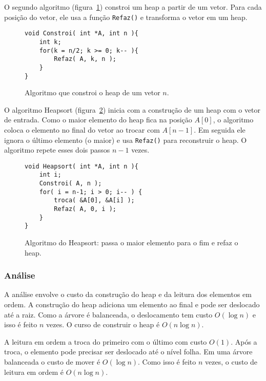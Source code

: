 O segundo algoritmo (figura~\ref{aula03:algo:heap:constroi}) constroi
um heap a partir de um vetor. 
Para cada posição do vetor, ele usa a função \lstinline{Refaz()} e transforma
o vetor em um heap.
%
\begin{figure}[!htb]
\centering
\begin{framed}
\begin{lstlisting}
void Constroi( int *A, int n ){
	int k;
	for(k = n/2; k >= 0; k-- ){
		Refaz( A, k, n );
	}
}
\end{lstlisting}
\end{framed}
\caption{Algoritmo que constroi o heap de um vetor $n$.}
\label{aula03:algo:heap:constroi}
\end{figure}

O algoritmo Heapsort (figura~\ref{aula03:algo:heapsort}) inicia com a construção
de um heap com o vetor de entrada.
Como o maior elemento do heap fica na posição $A[0]$,
o algoritmo coloca o elemento no final do vetor ao trocar com $A[n-1]$.
Em seguida ele ignora o último elemento (o maior) e usa \lstinline{Refaz()} para
reconstruir o heap.
O algoritmo repete esses dois passos $n-1$ vezes.
%
\begin{figure}[!htb]
\centering
\begin{framed}
\begin{lstlisting}
void Heapsort( int *A, int n ){
	int i;
	Constroi( A, n );
	for( i = n-1; i > 0; i-- ) {
		troca( &A[0], &A[i] );
		Refaz( A, 0, i );
	}
}
\end{lstlisting}
\end{framed}
\caption{Algoritmo do Heapsort: passa o maior elemento para o fim e refaz o heap.}
\label{aula03:algo:heapsort}
\end{figure}

\subsubsection*{Análise}

A análise envolve o custo da construção do heap e da leitura dos elementos em ordem.
A construção do heap adiciona um elemento ao final e pode ser deslocado até a raiz.
Como a árvore é balanceada, o deslocamento tem custo $O(\log n)$ e 
isso é feito $n$ vezes.
O curso de construir o heap é $O(n \log n)$. 

A leitura em ordem a troca do primeiro com o último com custo $O(1)$. Após a troca,
o elemento pode precisar ser deslocado até o nível folha.
Em uma árvore balanceada o custo de mover é $O(\log n)$.
Como isso é feito $n$ vezes, o custo de leitura em ordem é $O(n \log n)$.

